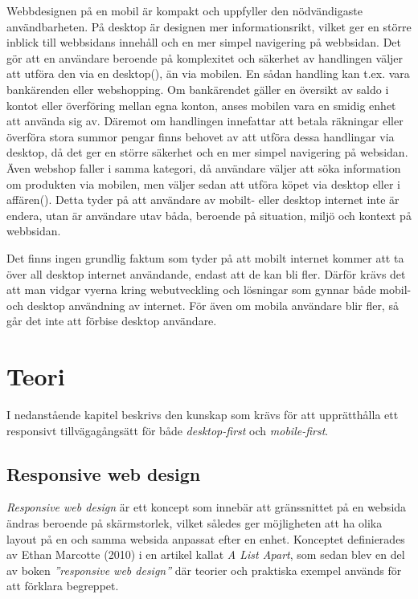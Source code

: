 \documentclass[11pt]{article}
\begin{document}
Webbdesignen på en mobil är kompakt och uppfyller den nödvändigaste användbarheten.
På desktop är designen mer informationsrikt, vilket ger en större inblick till webbsidans innehåll och en mer simpel navigering på webbsidan. Det gör att en användare beroende på komplexitet och säkerhet av handlingen väljer att utföra den via en desktop(\cite{userbeh}), än via mobilen. En sådan handling kan t.ex. vara bankärenden eller webshopping. Om bankärendet gäller en översikt av saldo i kontot eller överföring mellan egna konton, anses mobilen vara en smidig enhet att använda sig av. Däremot om handlingen innefattar att betala räkningar eller överföra stora summor pengar finns behovet av att utföra dessa handlingar via desktop, då det ger en större säkerhet och en mer simpel navigering på websidan. Även webshop faller i samma kategori, då användare väljer att söka information om produkten via mobilen, men väljer sedan att utföra köpet via desktop eller i affären(\cite{userbeh}). Detta tyder på att användare av mobilt- eller desktop internet inte är endera, utan är användare utav båda, beroende på situation, miljö och kontext på webbsidan.

Det finns ingen grundlig faktum som tyder på att mobilt internet kommer att ta över all desktop internet användande, endast att de kan bli fler. Därför krävs det att man vidgar vyerna kring webutveckling och lösningar som gynnar både mobil- och desktop användning av internet. För även om mobila användare blir fler, så går det inte att förbise desktop användare.
\newpage

\section{Teori}
I nedanstående kapitel beskrivs  den kunskap som krävs för att upprätthålla ett responsivt tillvägagångsätt för både \textit{desktop-first} och \textit{mobile-first}.
\subsection{Responsive web design}
\textit{Responsive web design} är ett koncept som innebär att gränssnittet på en websida ändras beroende på skärmstorlek, vilket således ger möjligheten att ha olika layout på en och samma websida anpassat efter en enhet. Konceptet definierades av Ethan Marcotte (2010) i en artikel kallat \textit{A List Apart}, som sedan blev en del av boken \textit{”responsive web design”} där teorier och praktiska exempel används för att förklara begreppet. 
\end{document}

